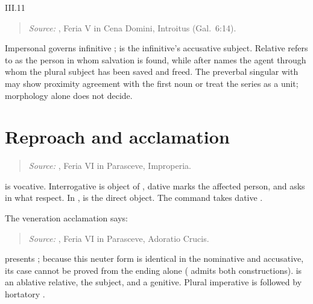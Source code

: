 \begin{courseunit}{III.11}
\begin{quote}

\emph{Source:} \Missal, Feria V in Cena Domini, Introitus (Gal.~6:14).
\end{quote}

Impersonal  governs infinitive ;  is
the infinitive's accusative subject. Relative  refers to
 as the person in whom salvation is found,
while  after  names the agent through whom the plural
subject has been saved and freed. The preverbal singular  with
 may show proximity agreement with
the first noun or treat the series as a unit; morphology alone does not decide.

\section{Reproach and acclamation}

\begin{quote}

\emph{Source:} \Missal, Feria VI in Parasceve, Improperia.
\end{quote}

 is vocative. Interrogative  is object of
, dative  marks the affected person, and
 asks in what respect. In ,  is
the direct object. The command  takes dative .

The veneration acclamation says:
\begin{quote}

\emph{Source:} \Missal, Feria VI in Parasceve, Adoratio Crucis.
\end{quote}
 presents ; because this neuter form is identical in
the nominative and accusative, its case cannot be proved from the ending alone
( admits both constructions).  is an ablative
relative,  the subject, and  a genitive. Plural
imperative  is followed by hortatory .


\end{courseunit}
